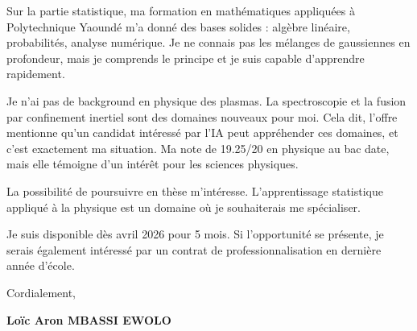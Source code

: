 \documentclass[a4paper,11pt]{article}
\begin{document}
\vspace{0.25cm}

Sur la partie statistique, ma formation en mathématiques appliquées à Polytechnique Yaoundé m'a donné des bases solides : algèbre linéaire, probabilités, analyse numérique. Je ne connais pas les mélanges de gaussiennes en profondeur, mais je comprends le principe et je suis capable d'apprendre rapidement.

\vspace{0.25cm}

Je n'ai pas de background en physique des plasmas. La spectroscopie et la fusion par confinement inertiel sont des domaines nouveaux pour moi. Cela dit, l'offre mentionne qu'un candidat intéressé par l'IA peut appréhender ces domaines, et c'est exactement ma situation. Ma note de 19.25/20 en physique au bac date, mais elle témoigne d'un intérêt pour les sciences physiques.

\vspace{0.25cm}

La possibilité de poursuivre en thèse m'intéresse. L'apprentissage statistique appliqué à la physique est un domaine où je souhaiterais me spécialiser.

\vspace{0.25cm}

Je suis disponible dès avril 2026 pour 5 mois. Si l'opportunité se présente, je serais également intéressé par un contrat de professionnalisation en dernière année d'école.

\vspace{0.4cm}

Cordialement,

\vspace{0.8cm}

\textbf{Loïc Aron MBASSI EWOLO}
\end{document}
